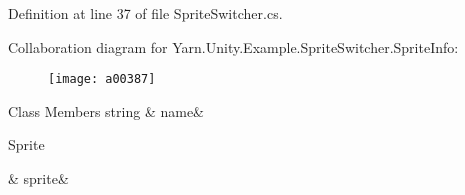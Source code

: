 Definition at line 37 of file Sprite\-Switcher.\-cs.



Collaboration diagram for Yarn.\-Unity.\-Example.\-Sprite\-Switcher.\-Sprite\-Info\-:
\nopagebreak
\begin{figure}[H]
\begin{center}
\leavevmode
\texttt{[image: a00387]}
\end{center}
\end{figure}
\begin{DoxyFields}{Class Members}
\hypertarget{a00163_a3f5bca2fff413dfe075c1fcf7e58369c}{string}\label{a00163_a3f5bca2fff413dfe075c1fcf7e58369c}
&
name&
\\
\hline

\hypertarget{a00163_adc58df011dc2841837b6cf775b372061}{Sprite}\label{a00163_adc58df011dc2841837b6cf775b372061}
&
sprite&
\\
\hline

\end{DoxyFields}
